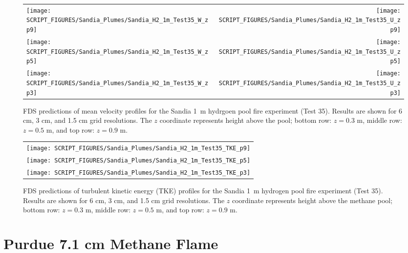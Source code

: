 \newpage

\begin{figure}[p]
\begin{tabular*}{\textwidth}{l@{\extracolsep{\fill}}r}
\texttt{[image: SCRIPT\_FIGURES/Sandia\_Plumes/Sandia\_H2\_1m\_Test35\_W\_zp9]} &
\texttt{[image: SCRIPT\_FIGURES/Sandia\_Plumes/Sandia\_H2\_1m\_Test35\_U\_zp9]} \\
\texttt{[image: SCRIPT\_FIGURES/Sandia\_Plumes/Sandia\_H2\_1m\_Test35\_W\_zp5]} &
\texttt{[image: SCRIPT\_FIGURES/Sandia\_Plumes/Sandia\_H2\_1m\_Test35\_U\_zp5]} \\
\texttt{[image: SCRIPT\_FIGURES/Sandia\_Plumes/Sandia\_H2\_1m\_Test35\_W\_zp3]} &
\texttt{[image: SCRIPT\_FIGURES/Sandia\_Plumes/Sandia\_H2\_1m\_Test35\_U\_zp3]}
\end{tabular*}
\caption[Sandia 1~m hydrogen pool fire (Test 35) mean velocity profiles]
{FDS predictions of mean velocity profiles for the Sandia 1~m hydrgoen pool fire experiment (Test 35). Results are shown for 6 cm, 3 cm, and 1.5 cm grid resolutions. The $z$ coordinate represents height above the pool; bottom row: $z=0.3$ m, middle row: $z=0.5$ m, and top row: $z=0.9$ m.}
\label{Sandia_H2_1m_Test35_velocity}
\end{figure}

\begin{figure}[p]
\begin{center}
\begin{tabular}{c}
\texttt{[image: SCRIPT\_FIGURES/Sandia\_Plumes/Sandia\_H2\_1m\_Test35\_TKE\_p9]} \\
\texttt{[image: SCRIPT\_FIGURES/Sandia\_Plumes/Sandia\_H2\_1m\_Test35\_TKE\_p5]} \\
\texttt{[image: SCRIPT\_FIGURES/Sandia\_Plumes/Sandia\_H2\_1m\_Test35\_TKE\_p3]}
\end{tabular}
\caption[Sandia 1~m hydrogen pool fire (Test 25) turbulent kinetic energy]
{FDS predictions of turbulent kinetic energy (TKE) profiles for the Sandia 1~m hydrogen pool fire experiment (Test 35). Results are shown for 6 cm, 3 cm, and 1.5 cm grid resolutions. The $z$ coordinate represents height above the methane pool; bottom row: $z=0.3$ m, middle row: $z=0.5$ m, and top row: $z=0.9$ m.}
\label{Sandia_H2_1m_Test35_tke}
\end{center}
\end{figure}


\clearpage

\section{Purdue 7.1 cm Methane Flame}
\label{Purdue_Flames}

